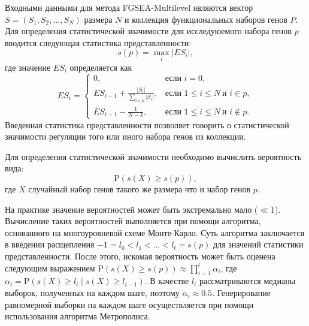 Входными данными для метода FGSEA-Multilevel являются вектор $S = \left(S_1, S_2, \ldots, S_N\right)$ размера $N$ и коллекция функциональных наборов генов $P$.
Для определения статистической значимости для исследуюемого набора генов $p$ вводится следующая статистика представленности:
\[
    s(p) = \max_i \vert ES_i \vert,
\]
где значение $ES_i$ определяется как
\[
    ES_i = 
    \begin{cases}
        0, & \text{если } i = 0, \\
        ES_{i - 1} + \frac{\vert S_i \vert}{\sum\limits_{i \in p} \vert S_i \vert}, & \text{если } 1 \leqslant i \leqslant N \ \text{и } i \in p, \\
        ES_{i - 1} - \frac{1}{N - k}, & \text{если } 1 \leqslant i \leqslant N \ \text{и } i \not\in p.
    \end{cases}    
\]
Введенная статистика представленности позволяет говорить о статистической значимости регуляции того или иного набора генов из коллекции.

Для определения статистической значимости необходимо вычислить вероятность вида:
\[
    \mathrm{P} \left(s(X) \geqslant s(p) \right),
\]
где $X$ случайный набор генов такого же размера что и набор генов $p$. 

На практике значение вероятностей может быть экстремально мало ($\ll 1$). 
Вычисление таких вероятностей выполняется при помощи алгоритма, основанного на многоуровневой схеме Монте-Карло.
Суть алгоритма заключается в введении расщепления $-1 = l_0 < l_1 < \ldots < l_t = s(p)$ для значений статистики представленности.
После этого, искомая вероятность может быть оценена следующим выражением $\mathrm{P} \left(s(X) \geqslant s(p) \right) \approx \prod\limits_{i = 1}^{t} \alpha_i$, где $\alpha_i = \mathrm{P} \left(s(X) \geqslant l_i \mid s(X) \geqslant l_{i - 1} \right)$.
В качестве $l_i$ рассматриваются медианы выборок, полученных на каждом шаге, поэтому $\alpha_i \approx 0.5$.
Генерирование равномерной выборки на каждом шаге осуществляется при помощи использования алгоритма Метрополиса. 

